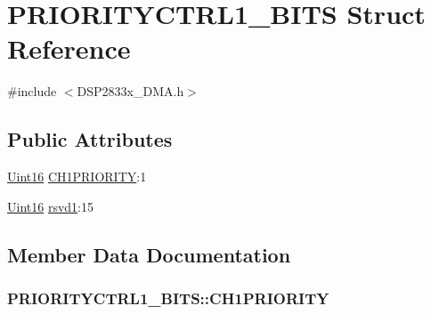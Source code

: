 \hypertarget{struct_p_r_i_o_r_i_t_y_c_t_r_l1___b_i_t_s}{}\section{P\+R\+I\+O\+R\+I\+T\+Y\+C\+T\+R\+L1\+\_\+\+B\+I\+T\+S Struct Reference}
\label{struct_p_r_i_o_r_i_t_y_c_t_r_l1___b_i_t_s}


{\ttfamily \#include $<$D\+S\+P2833x\+\_\+\+D\+M\+A.\+h$>$}

\subsection*{Public Attributes}
\begin{DoxyCompactItemize}
\item 
\hyperlink{_d_s_p2833x___device_8h_a59a9f6be4562c327cbfb4f7e8e18f08b}{Uint16} \hyperlink{struct_p_r_i_o_r_i_t_y_c_t_r_l1___b_i_t_s_aa8454c99ab7bf8322b26c5d0e09e45dc}{C\+H1\+P\+R\+I\+O\+R\+I\+T\+Y}\+:1
\item 
\hyperlink{_d_s_p2833x___device_8h_a59a9f6be4562c327cbfb4f7e8e18f08b}{Uint16} \hyperlink{struct_p_r_i_o_r_i_t_y_c_t_r_l1___b_i_t_s_a03c77efef280f7fd3c2538a8c823d3f1}{rsvd1}\+:15
\end{DoxyCompactItemize}


\subsection{Member Data Documentation}
\hypertarget{struct_p_r_i_o_r_i_t_y_c_t_r_l1___b_i_t_s_aa8454c99ab7bf8322b26c5d0e09e45dc}{}
\subsubsection[{C\+H1\+P\+R\+I\+O\+R\+I\+T\+Y}]{ P\+R\+I\+O\+R\+I\+T\+Y\+C\+T\+R\+L1\+\_\+\+B\+I\+T\+S\+::\+C\+H1\+P\+R\+I\+O\+R\+I\+T\+Y}\label{struct_p_r_i_o_r_i_t_y_c_t_r_l1___b_i_t_s_aa8454c99ab7bf8322b26c5d0e09e45dc}
\hypertarget{struct_p_r_i_o_r_i_t_y_c_t_r_l1___b_i_t_s_a03c77efef280f7fd3c2538a8c823d3f1}{}
